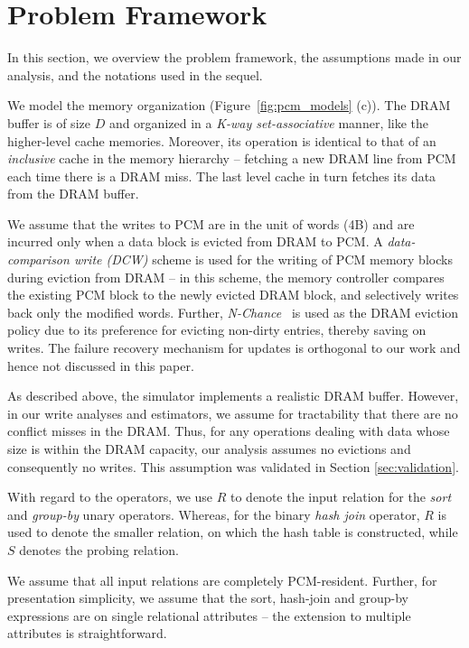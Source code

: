 \section{Problem Framework}
\label{sec:framework}
In this section, we overview the problem framework, the assumptions made
in our analysis, and the notations used in the sequel.

We model the \model{} memory organization (Figure~\ref{fig:pcm_models}
(c)). The DRAM buffer is of size $D$ and organized in a \emph{K-way
set-associative} manner, like the higher-level cache memories. Moreover,
its operation is identical to that of an \emph{inclusive} cache in the
memory hierarchy -- fetching a new DRAM line from PCM each time there
is a DRAM miss. The last level cache in turn fetches its data from the
DRAM buffer.

We assume that the writes to PCM are in the unit of words (4B) and are incurred only when a data block is evicted from DRAM to PCM. A \textit{data-comparison write (DCW)} scheme \cite{write} is used for
the writing of PCM memory blocks during eviction from DRAM -- in this
scheme, the memory controller compares the existing PCM block to the newly
evicted DRAM block, and selectively writes back only the modified words.
Further, \textit{N-Chance}~\cite{nchance} is used as the DRAM eviction
policy due to its preference for evicting non-dirty entries, thereby
saving on writes. The failure recovery mechanism for updates is orthogonal to our work and hence not discussed in this paper.

As described above, the simulator implements a realistic DRAM
buffer. However, in our write analyses and estimators, we assume for
tractability that there are no conflict misses in the DRAM. Thus, for
any operations dealing with data whose size is within the DRAM capacity,
our analysis assumes no evictions and consequently no writes. This assumption was validated in Section \ref{sec:validation}.

With regard to the operators, we use $R$ to denote the input relation
for the \textit{sort} and \textit{group-by} unary operators.  Whereas,
for the binary \textit{hash join} operator, $R$ is used to denote the
smaller relation, on which the hash table is constructed, while $S$
denotes the probing relation. 

We assume that all input relations are completely PCM-resident.
Further, for presentation simplicity, we assume that the sort,
hash-join and group-by expressions are on single relational attributes --
the extension to multiple attributes is straightforward.

